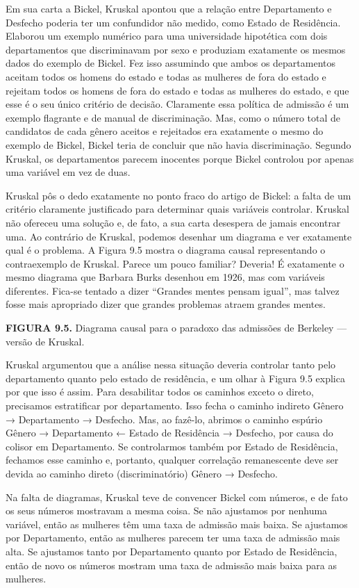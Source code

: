 \documentclass[11pt,a5paper,twoside]{book}
\begin{document}
Em sua carta a Bickel, Kruskal apontou que a relação entre Departamento e Desfecho poderia ter um confundidor não medido, como Estado de Residência. Elaborou um exemplo numérico para uma universidade hipotética com dois departamentos que discriminavam por sexo e produziam exatamente os mesmos dados do exemplo de Bickel. Fez isso assumindo que ambos os departamentos aceitam todos os homens do estado e todas as mulheres de fora do estado e rejeitam todos os homens de fora do estado e todas as mulheres do estado, e que esse é o seu único critério de decisão. Claramente essa política de admissão é um exemplo flagrante e de manual de discriminação. Mas, como o número total de candidatos de cada gênero aceitos e rejeitados era exatamente o mesmo do exemplo de Bickel, Bickel teria de concluir que não havia discriminação. Segundo Kruskal, os departamentos parecem inocentes porque Bickel controlou por apenas uma variável em vez de duas.

Kruskal pôs o dedo exatamente no ponto fraco do artigo de Bickel: a falta de um critério claramente justificado para determinar quais variáveis controlar. Kruskal não ofereceu uma solução e, de fato, a sua carta desespera de jamais encontrar uma. Ao contrário de Kruskal, podemos desenhar um diagrama e ver exatamente qual é o problema. A Figura 9.5 mostra o diagrama causal representando o contraexemplo de Kruskal. Parece um pouco familiar? Deveria! É exatamente o mesmo diagrama que Barbara Burks desenhou em 1926, mas com variáveis diferentes. Fica-se tentado a dizer “Grandes mentes pensam igual”, mas talvez fosse mais apropriado dizer que grandes problemas atraem grandes mentes.

\textbf{FIGURA 9.5.} Diagrama causal para o paradoxo das admissões de Berkeley — versão de Kruskal.

Kruskal argumentou que a análise nessa situação deveria controlar tanto pelo departamento quanto pelo estado de residência, e um olhar à Figura 9.5 explica por que isso é assim. Para desabilitar todos os caminhos exceto o direto, precisamos estratificar por departamento. Isso fecha o caminho indireto Gênero → Departamento → Desfecho. Mas, ao fazê-lo, abrimos o caminho espúrio Gênero → Departamento ← Estado de Residência → Desfecho, por causa do colisor em Departamento. Se controlarmos também por Estado de Residência, fechamos esse caminho e, portanto, qualquer correlação remanescente deve ser devida ao caminho direto (discriminatório) Gênero → Desfecho.

Na falta de diagramas, Kruskal teve de convencer Bickel com números, e de fato os seus números mostravam a mesma coisa. Se não ajustamos por nenhuma variável, então as mulheres têm uma taxa de admissão mais baixa. Se ajustamos por Departamento, então as mulheres parecem ter uma taxa de admissão mais alta. Se ajustamos tanto por Departamento quanto por Estado de Residência, então de novo os números mostram uma taxa de admissão mais baixa para as mulheres.
\end{document}
